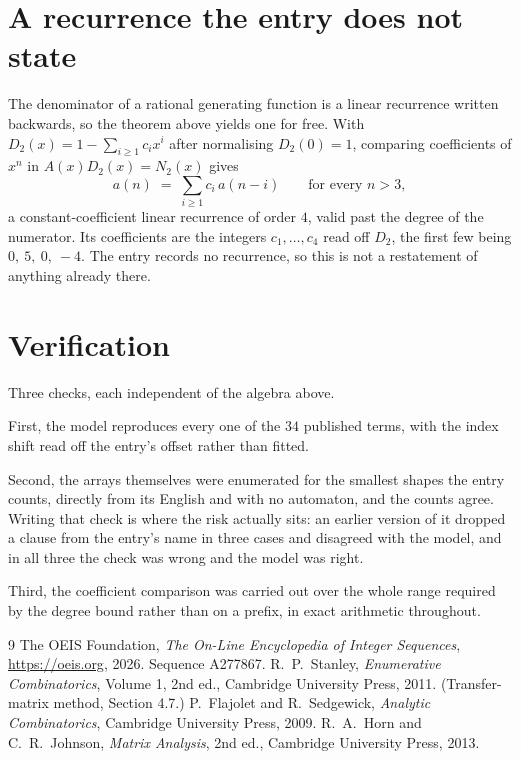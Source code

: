 \documentclass[11pt,a4paper]{article}
\theoremstyle{plain}
\theoremstyle{definition}
\begin{document}
\section{A recurrence the entry does not state}

The denominator of a rational generating function is a linear recurrence written backwards, so
the theorem above yields one for free. With $D_2(x)=1-\sum_{i\ge1}c_ix^i$ after normalising
$D_2(0)=1$, comparing coefficients of $x^n$ in $A(x)D_2(x)=N_2(x)$ gives
\[
a(n)\;=\;\sum_{i\ge1}c_i\,a(n-i)\qquad\text{for every }n>3,
\]
a constant-coefficient linear recurrence of order $4$, valid past the degree of the
numerator. Its coefficients are the integers $c_1,\dots,c_{4}$ read off $D_2$, the first few being $0,\ 5,\ 0,\ -4$. The entry records no recurrence, so this is not a restatement of anything
already there.

\section{Verification}

Three checks, each independent of the algebra above.

First, the model reproduces every one of the $34$ published terms, with the index shift
read off the entry's offset rather than fitted.

Second, the arrays themselves were enumerated for the smallest shapes the entry counts,
directly from its English and with no automaton, and the counts agree. Writing that check is
where the risk actually sits: an earlier version of it dropped a clause from the entry's name
in three cases and disagreed with the model, and in all three the check was wrong and the model
was right.

Third, the coefficient comparison was carried out over the whole range required by the degree
bound rather than on a prefix, in exact arithmetic throughout.

\begin{thebibliography}{9}
 The OEIS Foundation, \emph{The On-Line Encyclopedia of Integer
Sequences}, \url{https://oeis.org}, 2026. Sequence A277867.
 R.~P.~Stanley, \emph{Enumerative Combinatorics}, Volume 1, 2nd ed.,
Cambridge University Press, 2011. (Transfer-matrix method, Section 4.7.)
 P.~Flajolet and R.~Sedgewick, \emph{Analytic Combinatorics}, Cambridge
University Press, 2009.
 R.~A.~Horn and C.~R.~Johnson, \emph{Matrix Analysis}, 2nd ed., Cambridge
University Press, 2013.
\end{thebibliography}
\end{document}
